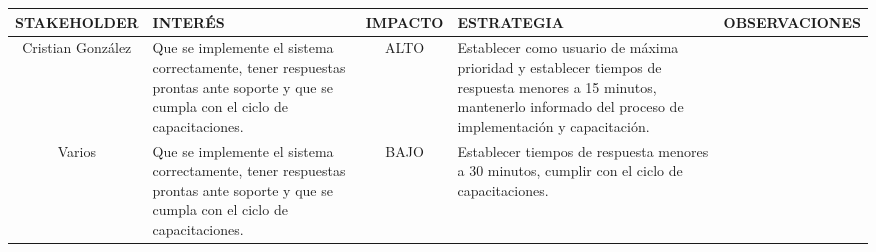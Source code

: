 \begin{table}[H]
	\centering
	\begin{tabular}{| c | p{5cm} | c | p{5cm} | p{5cm} |}
	\hline
	\textbf{STAKEHOLDER} & \textbf{INTER\'ES} & \textbf{IMPACTO} & \textbf{ESTRATEGIA} & 
	\textbf{OBSERVACIONES} \\ \hline

	Cristian Gonz\'alez	& Que se implemente el sistema correctamente, tener respuestas prontas
	ante soporte y que se cumpla con el ciclo de capacitaciones. & ALTO & Establecer como 
	usuario de m\'axima prioridad y establecer tiempos de respuesta menores a 15 minutos, 
	mantenerlo informado del proceso de implementaci\'on y capacitaci\'on. & \\
	\hline
	Varios & Que se implemente el sistema correctamente, tener respuestas prontas
	ante soporte y que se cumpla con el ciclo de capacitaciones. & BAJO & Establecer tiempos de 
	respuesta menores a 30 minutos, cumplir con el ciclo de capacitaciones. & \\
	\hline
	\end{tabular}
\end{table}